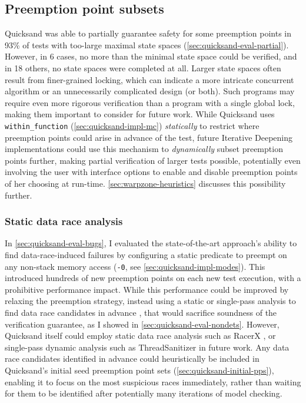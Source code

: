 \subsection{Preemption point subsets}
\label{sec:quicksand-discussion-subsets}

Quicksand was able to partially guarantee safety for some preemption points
in 93\% of tests with too-large maximal state spaces (\cref{sec:quicksand-eval-partial}).
However, in 6 cases, no more than the minimal state space could be verified,
and in 18 others, no state spaces were completed at all.
Larger state spaces often result from finer-grained locking,
which can indicate a more intricate concurrent algorithm or an unnecessarily complicated design (or both).
Such programs may require even more rigorous verification than a program with a single global lock,
making them important to consider for future work.
While Quicksand uses {\tt within\_function} (\cref{sec:quicksand-impl-mc})
{\em statically} to restrict where preemption points could arise in advance of the test,
future
Iterative Deepening
implementations could use this mechanism to {\em dynamically} subset preemption points further,
making partial verification of larger tests possible,
potentially even involving the user with interface options
to enable and disable preemption points of her choosing at run-time.
\cref{sec:warpzone-heuristics} discusses this possibility further.

\subsubsection{Static data race analysis}

In \cref{sec:quicksand-eval-bugs}, I evaluated the state-of-the-art approach's ability to find data-race-induced failures
by configuring a static predicate to preempt on any non-stack memory access
({\tt -0}, see \cref{sec:quicksand-impl-modes}).
This introduced hundreds of new preemption points on each new test execution,
with a prohibitive performance impact.
While this performance could be improved by
relaxing the preemption strategy,
instead using a static or single-pass analysis to find data race candidates in advance \cite{portend},
that would sacrifice soundness of the verification guarantee, as I showed in \cref{sec:quicksand-eval-nondets}.
However, Quicksand itself could employ static data race analysis such as RacerX \cite{racerx},
or single-pass dynamic analysis such as ThreadSanitizer \cite{tsan} in future work.
Any data race candidates identified in advance could heuristically be included in Quicksand's initial seed preemption point sets
(\cref{sec:quicksand-initial-pps}),
enabling it to focus on the most suspicious races immediately,
rather than waiting for them to be identified after potentially many iterations of model checking.

